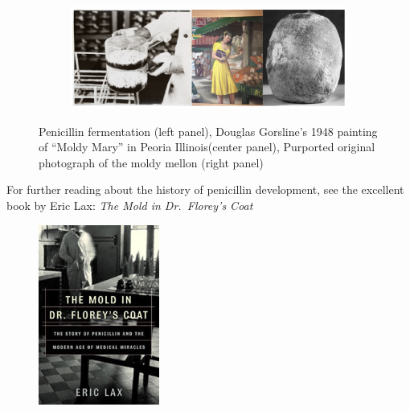 \documentclass[
  letterpaper,
  DIV=11,
  numbers=noendperiod]{scrreprt}
\begin{document}
\begin{figure}

{\centering 

\begin{figure}

{\centering \includegraphics{images/moldymary.png}

}

\end{figure}

}

\caption{\label{fig-moldymarry}Penicillin fermentation (left panel),
Douglas Gorsline's 1948 painting of ``Moldy Mary'' in Peoria
Illinois(center panel), Purported original photograph of the moldy
mellon (right panel)}

\end{figure}

\begin{tcolorbox}[enhanced jigsaw, breakable, left=2mm, arc=.35mm, toprule=.15mm, colback=white, leftrule=.75mm, opacityback=0, rightrule=.15mm, bottomrule=.15mm]

For further reading about the history of penicillin development, see the
excellent book by Eric Lax: \emph{The Mold in Dr.~Florey's Coat}

\begin{figure}[H]

{\centering \includegraphics[width=1.5625in,height=\textheight]{images/lax.png}

}

\end{figure}

\end{tcolorbox}
\end{document}
